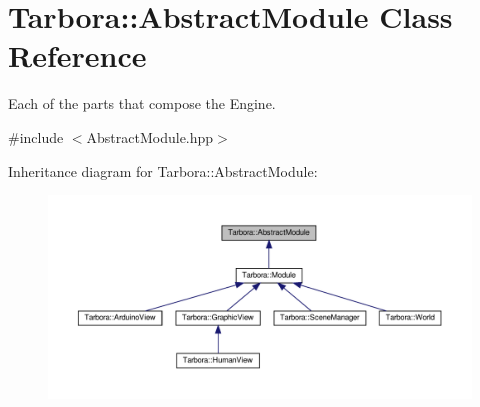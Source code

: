 \hypertarget{classTarbora_1_1AbstractModule}{}\section{Tarbora\+:\+:Abstract\+Module Class Reference}
\label{classTarbora_1_1AbstractModule}


Each of the parts that compose the Engine.  




{\ttfamily \#include $<$Abstract\+Module.\+hpp$>$}



Inheritance diagram for Tarbora\+:\+:Abstract\+Module\+:
\nopagebreak
\begin{figure}[H]
\begin{center}
\leavevmode
\includegraphics[width=350pt]{classTarbora_1_1AbstractModule__inherit__graph}
\end{center}
\end{figure}
